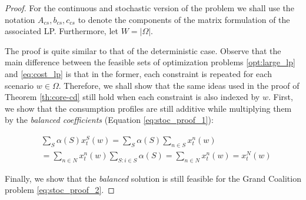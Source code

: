 \documentclass[sigconf, table]{acmart}
\newcommand{\ccs}{c_{cs}}
\newcommand{\acs}{A_{cs}}
\newcommand{\bcs}{b_{cs}}
\begin{document}
\begin{proof}
For the continuous and stochastic version of the problem we shall use the notation $\acs, \bcs, \ccs$ to denote the components of the matrix formulation of the associated LP.
Furthermore, let $W = |\Omega|$.

The proof is quite similar to that of the deterministic case. Observe that the main difference between the feasible sets of optimization problems \eqref{opt:large_lp} and \eqref{eq:cost_lp} is that in the former, each constraint is repeated for each scenario $w \in \Omega$. Therefore, we shall show that the same ideas used in the proof of Theorem \ref{th:core-cd} still hold when each constraint is also indexed by $w$. First,  we show that the consumption profiles are still additive while multiplying them by the \textit{balanced coefficients} (Equation \eqref{eq:stoc_proof_1}):

\begin{equation}\label{eq:stoc_proof_1}
\begin{aligned}
      &\sum_S \alpha(S) x^S_t(w)  = \sum_S \alpha(S) \sum_{n \in S}x^n_t(w) \\ &= \sum_{n \in N}x^n_t(w)\sum_{S \colon i \in S} \alpha(S) = \sum_{n \in N} x^n_t(w) = x^N_t(w)
\end{aligned}
\end{equation}

Finally, we show that the \textit{balanced} solution is still feasible for the Grand Coalition problem \eqref{eq:stoc_proof_2}.


\end{proof}
\end{document}
